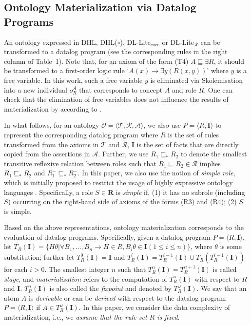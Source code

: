 \documentclass[final,1p,times]{elsarticle}
\begin{document}
\subsection{Ontology Materialization via Datalog Programs}

An ontology
expressed in DHL, DHL($\circ$), DL-Lite$_{core}$ or DL-Lite$_{\mathcal{R}}$ can be transformed to a datalog program
(see the corresponding rules in the right column of Table~1).
Note that, for an axiom of the form (T4) $A\sqsubseteq\exists R$, it should be transformed to
a first-order logic rule `$A(x)\rightarrow \exists y(R(x,y))$' where $y$ is a free variable.
In this work, such a free variable $y$ is eliminated via Skolemisation into a new individual $o_{R}^A$
that corresponds to concept $A$ and role $R$. One can check that the elimination of free variables
does not influence the results of materialization by according to \cite{CalvaneseGLLR07}.

In what follows, for an ontology $\mathcal{O}=\langle\mathcal{T},\mathcal{R},\mathcal{A}\rangle$,
we also use $P=\langle R, \textbf{I}\rangle$ to represent the corresponding datalog program
where $R$ is the set of rules transformed from the axioms in $\mathcal{T}$ and $\mathcal{R}$,
$\textbf{I}$ is the set of facts that are directly copied from the assertions in $\mathcal{A}$.
Further, we use $R_1\sqsubseteq_{*}R_2$ to denote the smallest transitive reflexive relation
between roles such that $R_1\sqsubseteq R_2\in\mathcal{R}$ implies $R_1\sqsubseteq_{*}R_2$
and $R_1^-\sqsubseteq_{*}R_2^-$. In this paper, we also use the
notion of \emph{simple role}, which is initially proposed to restrict the
usage of highly expressive ontology languages \cite{HorrocksS04}.
Specifically, a role $S\in\textbf{R}$ is \emph{simple} if, (1) it has no subrole (including $S$)
occurring on the right-hand side of axioms of the forms (R3) and (R4); (2) $S^-$ is simple.

Based on the above representations, ontology materialization
corresponds to the evaluation of datalog programs.
Specifically, given a datalog program $P=\langle R, \textbf{I}\rangle$,
let $T_R(\textbf{I})=\{H\theta|\forall B_1,...,B_n\rightarrow H\in R, B_i\theta\in\textbf{I} (1\leq i\leq n)\}$,
where $\theta$ is some substitution; further let $T_R^{0}(\textbf{I})=\textbf{I}$ and
 $T_R^{i}(\textbf{I})=T_R^{i-1}(\textbf{I})\cup T_R(T_R^{i-1}(\textbf{I}))$ for each $i>0$.
The smallest integer $n$ such that $T_R^{n}(\textbf{I})= T_R^{n+1}(\textbf{I})$ is called \emph{stage},
and \emph{materialization} refers to the computation of $T_R^{n}(\textbf{I})$ with respect to $R$ and \textbf{I}.
$T_R^{n}(\textbf{I})$ is also called the \emph{fixpoint} and denoted by $T_R^{\omega}(\textbf{I})$.
We say that an atom $A$ is \emph{derivable} or can be \emph{derived} with respect
to the datalog program $P=\langle R, \textbf{I}\rangle$ if $A\in T_R^{\omega}(\textbf{I})$.
In this paper, we consider the data complexity of materialization, i.e., we \emph{assume that the rule set $R$ is fixed}.
\end{document}
